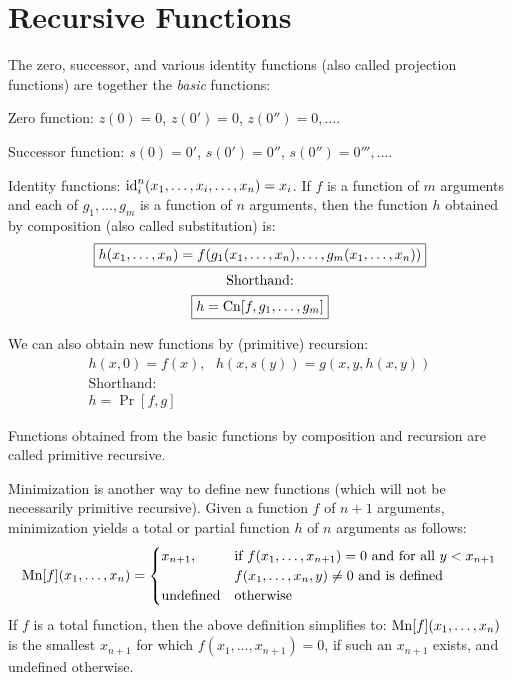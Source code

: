 \section{Recursive Functions} %
\label{sec:recursive_functions}
The zero, successor, and various identity functions (also called projection functions) are together the \emph{basic} functions:

Zero function: $z(0) = 0$, $z(0') = 0$, $z(0'')=0, \ldots$.

Successor function: $s(0) = 0'$, $s(0') = 0''$, $s(0'')=0''', \ldots$.

Identity functions: $\operatorname{id}_i^n(x_1,\ldots,x_i,\ldots,x_n) = x_i$.
\newline
If $f$ is a function of $m$ arguments and each of $g_1,\ldots,g_m$ is a function of $n$ arguments, then the function $h$ obtained by composition (also called substitution) is:
\begin{gather*}
  \boxed{h(x_1, \ldots, x_n) = f(g_1(x_1, \ldots, x_n), \ldots, g_m(x_1, \ldots, x_n))}\\
  \text{Shorthand:}\\
  \boxed{h = \operatorname{Cn}[f,g_1,\ldots,g_m]}
\end{gather*}

We can also obtain new functions by (primitive) recursion:
\begin{gather*}
  \boxed{h(x, 0) = f(x),~~~h(x, s(y)) = g(x, y, h(x, y))}\\
  \text{Shorthand:}\\
  \boxed{h=\Pr[f,g]}
\end{gather*}

Functions obtained from the basic functions by composition and recursion are called primitive recursive.

Minimization is another way to define new functions (which will not be necessarily primitive recursive).
Given a function $f$ of $n + 1$ arguments, minimization yields a total or partial function $h$ of $n$ arguments as follows:
\begin{align*}
  \operatorname{Mn}[f](x_1, \ldots, x_n) = \begin{cases}
    x_{n+1}, &\text{if $f(x_1,\ldots,x_{n+1}) = 0$ and for all $y < x_{n+1}$}\\
    &\text{$f(x_1,\ldots,x_n,y) \ne 0$ and is defined}\\
    \text{undefined} &\text{otherwise}
  \end{cases}
\end{align*}
If $f$ is a total function, then the above definition simplifies to: $\operatorname{Mn}[f](x_1, \ldots, x_n)$ is the smallest $x_{n+1}$ for which $f(x_1,\ldots,x_{n+1}) = 0$, if such an $x_{n+1}$ exists, and undefined otherwise.


